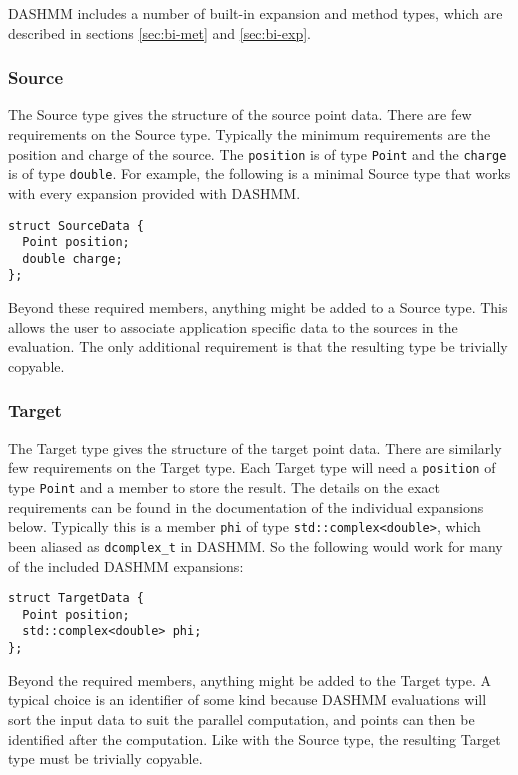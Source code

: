 DASHMM includes a number of built-in expansion and method types, which are
described in sections \ref{sec:bi-met} and \ref{sec:bi-exp}.


\subsubsection{Source}
The Source type gives the structure of the source point data. There
are few requirements on the Source type. Typically the minimum
requirements are the position and charge of the source. The \texttt{position}
is of type \texttt{Point} and the \texttt{charge} is of type
\texttt{double}. For example, the following is a minimal Source type that
works with every expansion provided with DASHMM.

\begin{verbatim}
struct SourceData {
  Point position;
  double charge;
};
\end{verbatim}

\noindent Beyond these required members, anything might be added to a Source
type. This allows the user to associate application specific data to
the sources in the evaluation. The only additional requirement is that
the resulting type be trivially copyable.

\subsubsection{Target}
The Target type gives the structure of the target point data. There
are similarly few requirements on the Target type. Each Target type
will need a \texttt{position} of type \texttt{Point} and a member to store
the result. The details on the exact requirements can be found in the
documentation of the individual expansions below. Typically this is a
member \texttt{phi} of type \texttt{std::complex<double>}, which been
aliased as \texttt{dcomplex\_t} in DASHMM. So the following would work
for many of the included DASHMM expansions:

\begin{verbatim}
struct TargetData {
  Point position;
  std::complex<double> phi;
};
\end{verbatim}

\noindent Beyond the required members, anything might be added to the Target
type. A typical choice is an identifier of some kind because DASHMM
evaluations will sort the input data to suit the parallel computation,
and points can then be identified after the computation. Like with the
Source type, the resulting Target type must be trivially copyable.

